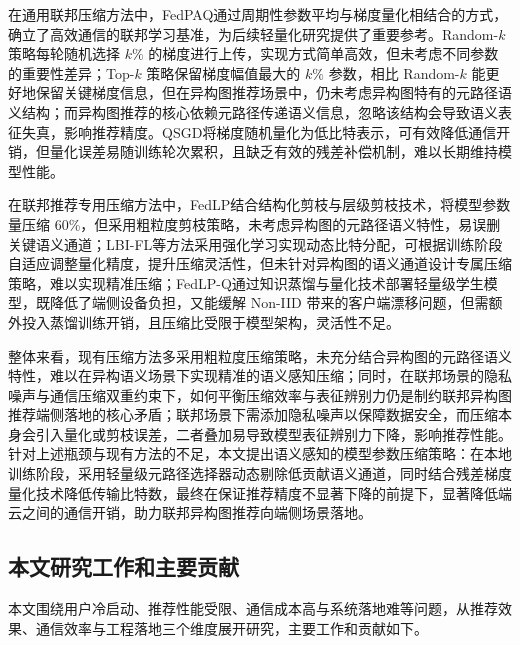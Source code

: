 在通用联邦压缩方法中，FedPAQ\cite{reisizadeh2020fedpaq}通过周期性参数平均与梯度量化相结合的方式，确立了高效通信的联邦学习基准，为后续轻量化研究提供了重要参考。Random-$k$ 策略每轮随机选择 $k\%$ 的梯度进行上传，实现方式简单高效，但未考虑不同参数的重要性差异；Top-$k$\cite{jiang2022fedmp} 策略保留梯度幅值最大的 $k\%$ 参数，相比 Random-$k$ 能更好地保留关键梯度信息，但在异构图推荐场景中，仍未考虑异构图特有的元路径语义结构；而异构图推荐的核心依赖元路径传递语义信息，忽略该结构会导致语义表征失真，影响推荐精度。QSGD\cite{alistarh2017qsgd}将梯度随机量化为低比特表示，可有效降低通信开销，但量化误差易随训练轮次累积，且缺乏有效的残差补偿机制，难以长期维持模型性能。

在联邦推荐专用压缩方法中，FedLP\cite{zhu2023fedlp}结合结构化剪枝与层级剪枝技术，将模型参数量压缩 60\%，但采用粗粒度剪枝策略，未考虑异构图的元路径语义特性，易误删关键语义通道；LBI-FL\cite{ding2025lbifl}等方法采用强化学习实现动态比特分配，可根据训练阶段自适应调整量化精度，提升压缩灵活性，但未针对异构图的语义通道设计专属压缩策略，难以实现精准压缩；FedLP-Q\cite{yi2023fedlpq}通过知识蒸馏与量化技术部署轻量级学生模型，既降低了端侧设备负担，又能缓解 Non-IID 带来的客户端漂移问题，但需额外投入蒸馏训练开销，且压缩比受限于模型架构，灵活性不足。

整体来看，现有压缩方法多采用粗粒度压缩策略，未充分结合异构图的元路径语义特性，难以在异构语义场景下实现精准的语义感知压缩；同时，在联邦场景的隐私噪声与通信压缩双重约束下，如何平衡压缩效率与表征辨别力仍是制约联邦异构图推荐端侧落地的核心矛盾；联邦场景下需添加隐私噪声以保障数据安全，而压缩本身会引入量化或剪枝误差，二者叠加易导致模型表征辨别力下降，影响推荐性能。针对上述瓶颈与现有方法的不足，本文提出语义感知的模型参数压缩策略：在本地训练阶段，采用轻量级元路径选择器动态剔除低贡献语义通道，同时结合残差梯度量化技术降低传输比特数，最终在保证推荐精度不显著下降的前提下，显著降低端云之间的通信开销，助力联邦异构图推荐向端侧场景落地。
\subsection{本文研究工作和主要贡献}
\label{sec:contrib}

本文围绕用户冷启动、推荐性能受限、通信成本高与系统落地难等问题，从推荐效果、通信效率与工程落地三个维度展开研究，主要工作和贡献如下。

